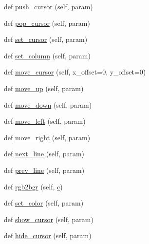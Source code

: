\begin{DoxyCompactItemize}
\item 
def \hyperlink{classwaflib_1_1ansiterm_1_1_ansi_term_a9f489138508401c64c6927f215d8d6da}{push\+\_\+cursor} (self, param)
\item 
def \hyperlink{classwaflib_1_1ansiterm_1_1_ansi_term_a2093c2f7ded18188b0bf2989a0083a18}{pop\+\_\+cursor} (self, param)
\item 
def \hyperlink{classwaflib_1_1ansiterm_1_1_ansi_term_aba842837a7fe351aa8459aa375249c69}{set\+\_\+cursor} (self, param)
\item 
def \hyperlink{classwaflib_1_1ansiterm_1_1_ansi_term_acd65956a7d56681cc669acca5bdd43fb}{set\+\_\+column} (self, param)
\item 
def \hyperlink{classwaflib_1_1ansiterm_1_1_ansi_term_ade95c6eb1c7ed7928780aad4e6b4e268}{move\+\_\+cursor} (self, x\+\_\+offset=0, y\+\_\+offset=0)
\item 
def \hyperlink{classwaflib_1_1ansiterm_1_1_ansi_term_a7725bd9ed185458669ad7601fb7ff9d9}{move\+\_\+up} (self, param)
\item 
def \hyperlink{classwaflib_1_1ansiterm_1_1_ansi_term_a7b2ea0403457b7cd8d0ac4088064d812}{move\+\_\+down} (self, param)
\item 
def \hyperlink{classwaflib_1_1ansiterm_1_1_ansi_term_a617dda0ced0a3e3f3443366d4a1c46bb}{move\+\_\+left} (self, param)
\item 
def \hyperlink{classwaflib_1_1ansiterm_1_1_ansi_term_a1388984c5cb5051d6c48682d1cd998b7}{move\+\_\+right} (self, param)
\item 
def \hyperlink{classwaflib_1_1ansiterm_1_1_ansi_term_a8ce79cf478dc1bf0cec2c12e28103522}{next\+\_\+line} (self, param)
\item 
def \hyperlink{classwaflib_1_1ansiterm_1_1_ansi_term_ac65f3453904e9c561f530b7c43e73f12}{prev\+\_\+line} (self, param)
\item 
def \hyperlink{classwaflib_1_1ansiterm_1_1_ansi_term_ad097d16ecb1babcef5970faccad1e7e9}{rgb2bgr} (self, \hyperlink{rfft2d_test_m_l_8m_ae0323a9039add2978bf5b49550572c7c}{c})
\item 
def \hyperlink{classwaflib_1_1ansiterm_1_1_ansi_term_a2b56ee3c8294f7e2e5bca7cc60e8ee05}{set\+\_\+color} (self, param)
\item 
def \hyperlink{classwaflib_1_1ansiterm_1_1_ansi_term_a594f6cf62d5e4ca33f2b88127fd6393d}{show\+\_\+cursor} (self, param)
\item 
def \hyperlink{classwaflib_1_1ansiterm_1_1_ansi_term_a2ca4bde33edd4afa92c8bda3f01d1dc9}{hide\+\_\+cursor} (self, param)
\item 

\end{DoxyCompactItemize}

